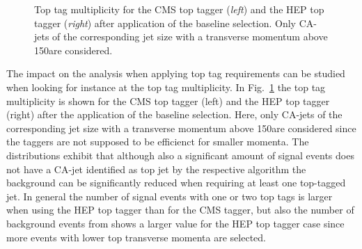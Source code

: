 \begin{figure}[!t]
  \centering
{}
  \caption{Top tag multiplicity for the CMS top tagger (\textit{left}) and the HEP top tagger (\textit{right}) after application of the baseline selection. Only CA-jets of the corresponding jet size with a transverse momentum above 150\gev are considered.}
  \label{fig:stop_top_tag_multi}
\end{figure} 
The impact on the analysis when applying top tag requirements can be studied when looking for instance at the top tag multiplicity. In Fig.~\ref{fig:stop_top_tag_multi} the top tag multiplicity is shown for the CMS top tagger (left) and the HEP top tagger (right) after the application of the baseline selection. Here, only CA-jets of the corresponding jet size with a transverse momentum above 150\gev are considered since the taggers are not supposed to be efficienct for smaller momenta. The distributions exhibit that although also a significant amount of signal events does not have a CA-jet identified as top jet by the respective algorithm the background can be significantly reduced when requiring at least one top-tagged jet. In general the number of signal events with one or two top tags is larger when using the HEP top tagger than for the CMS tagger, but also the number of background events from \ttbar shows a larger value for the HEP top tagger case since more \ttbar events with lower top transverse momenta are selected. \\

